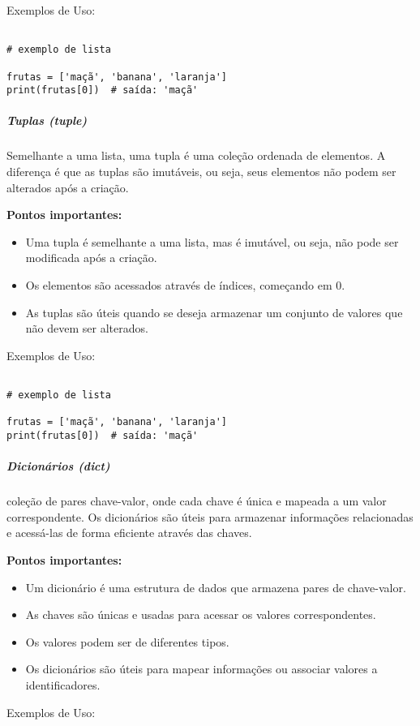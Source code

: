 \documentclass[a4paper, 12pt, onecolumn,singlespacing]{article}
\begin{document}
	Exemplos de Uso:
	
	\begin{verbatim}

# exemplo de lista

frutas = ['maçã', 'banana', 'laranja']
print(frutas[0])  # saída: 'maçã'

	\end{verbatim}
	\subparagraph{Tuplas (\textit{tuple})} Semelhante a uma lista, uma tupla é uma coleção ordenada de elementos. A diferença é que as tuplas são imutáveis, ou seja, seus elementos não podem ser alterados após a criação.
	
	\textbf{Pontos importantes:}
	\begin{itemize}
		\item Uma tupla é semelhante a uma lista, mas é imutável, ou seja, não pode ser modificada após a criação.
		\item Os elementos são acessados através de índices, começando em 0.
		\item As tuplas são úteis quando se deseja armazenar um conjunto de valores que não devem ser alterados.
	\end{itemize}
		Exemplos de Uso:
	
	\begin{verbatim}
		
# exemplo de lista

frutas = ['maçã', 'banana', 'laranja']
print(frutas[0])  # saída: 'maçã'

	\end{verbatim}

	\subparagraph{Dicionários (\textit{dict})} coleção de pares chave-valor, onde cada chave é única e mapeada a um valor correspondente. Os dicionários são úteis para armazenar informações relacionadas e acessá-las de forma eficiente através das chaves.
	
	\textbf{Pontos importantes:}
	\begin{itemize}
		\item Um dicionário é uma estrutura de dados que armazena pares de chave-valor.
		\item As chaves são únicas e usadas para acessar os valores correspondentes.
		\item Os valores podem ser de diferentes tipos.
		\item Os dicionários são úteis para mapear informações ou associar valores a identificadores.
	\end{itemize}
	Exemplos de Uso:
	
\end{document}

